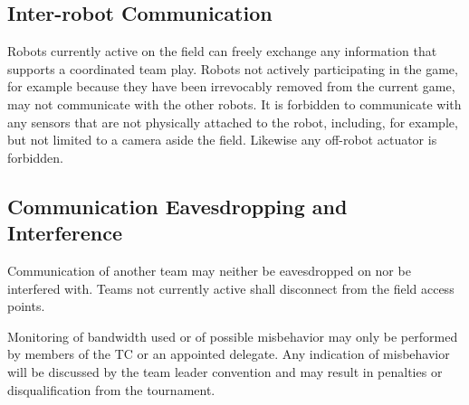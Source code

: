 \documentclass[12pt,twoside]{article}
\newenvironment{rulechange}{}{}
\begin{document}
\subsection{Inter-robot Communication}
\label{sec:inter-robot-comm}
Robots currently active on the field can freely exchange any
information that supports a coordinated team play. Robots not actively
participating in the game, for example because they have been
irrevocably removed from the current game, may not communicate with
the other robots. It is forbidden to communicate with any sensors that
are not physically attached to the robot, including, for example, but
not limited to a camera aside the field. Likewise any off-robot
actuator is forbidden.

\subsection{Communication Eavesdropping and Interference}
\label{sec:comm-tampering}
Communication of another team may neither be eavesdropped on nor be
interfered with. Teams not currently active shall disconnect from the
field access points.

Monitoring of bandwidth used or of possible misbehavior may only be
performed by members of the TC or an appointed delegate.
Any indication of misbehavior will be discussed by the team leader
convention and may result in penalties or disqualification from the
tournament.


\end{document}
